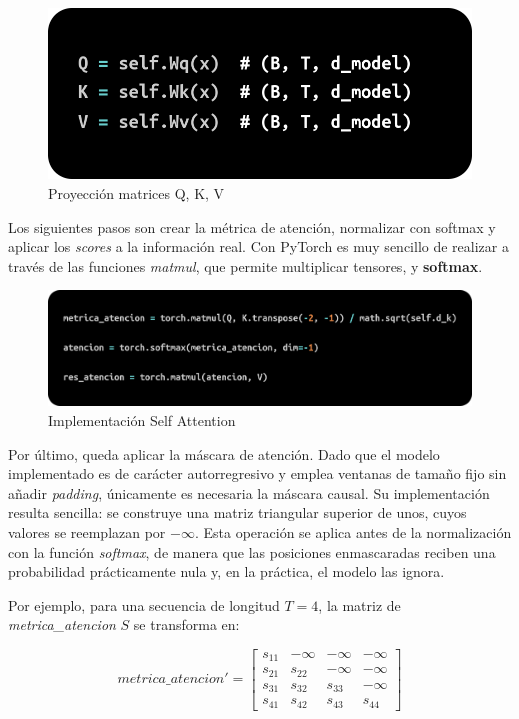\documentclass[11pt]{book}
\begin{document}
\begin{figure}[h]
    \centering
    \includegraphics[width=0.5\linewidth]{img/Q_K_V.png}
    \caption{Proyección matrices Q, K, V}
    \label{fig:Proyeccion8}
\end{figure}

Los siguientes pasos son crear la métrica de atención, normalizar con softmax y aplicar los \textit{scores} a la información real. Con PyTorch es muy sencillo de realizar a través de las funciones \textit{matmul}, que permite multiplicar tensores, y \textbf{softmax}. 

\begin{figure}[h]
    \centering
    \includegraphics[width=0.5\linewidth]{img/atencion.png}
    \caption{Implementación Self Attention}
    \label{fig:placeholder9}
\end{figure}

Por último, queda aplicar la máscara de atención. Dado que el modelo implementado es de carácter autorregresivo y emplea ventanas de tamaño fijo sin añadir \textit{padding}, únicamente es necesaria la máscara causal. Su implementación resulta sencilla: se construye una matriz triangular superior de unos, cuyos valores se reemplazan por $-\infty$. Esta operación se aplica antes de la normalización con la función \textit{softmax}, de manera que las posiciones enmascaradas reciben una probabilidad prácticamente nula y, en la práctica, el modelo las ignora.  

Por ejemplo, para una secuencia de longitud $T=4$, la matriz de \textit{metrica\_atencion} $S$ se transforma en:  

\[
metrica\_atencion' =
\begin{bmatrix}
s_{11} & -\infty & -\infty & -\infty \\
s_{21} & s_{22} & -\infty & -\infty \\
s_{31} & s_{32} & s_{33} & -\infty \\
s_{41} & s_{42} & s_{43} & s_{44}
\end{bmatrix}
\]
\end{document}
